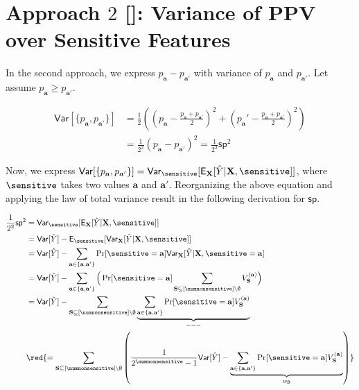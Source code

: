 















\section{Approach $ 2 $ []: Variance of PPV over Sensitive Features} 

In the second approach, we express $ p_\mathbf{a} - p_{\mathbf{a}'} $ with variance of $ p_\mathbf{a} $ and  $ p_{\mathbf{a}'} $.  Let assume $ p_\mathbf{a} \ge  p_{\mathbf{a}'} $. 

\begin{align*}
	\mathsf{Var}[\{p_\mathbf{a}, p_{\mathbf{a}'} \}] &= \frac{1}{2}((p_\mathbf{a} - \frac{p_\mathbf{a} + p_{\mathbf{a}'}}{2})^2 + (p_\mathbf{a}' - \frac{p_\mathbf{a} + p_{\mathbf{a}'}}{2})^2)\\
	&= \frac{1}{2^2}(p_\mathbf{a} -  p_{\mathbf{a}'})^2 = \frac{1}{2^2}\mathsf{sp}^2
\end{align*}

Now, we express $ \mathsf{Var}[\{p_\mathbf{a}, p_{\mathbf{a}'} \}] =  \mathsf{Var}_\sensitive[\mathsf{E}_{\mathbf{X}}[\hat{Y}|\mathbf{X}, \sensitive]] $, where $ \sensitive $ takes two values $ \mathbf{a} $ and $ \mathbf{a}' $.  Reorganizing the above equation and applying the law of total variance result in the following derivation for $ \mathsf{sp} $.

\begin{align*}
	\frac{1}{2^2}\mathsf{sp}^2 &= \mathsf{Var}_\sensitive[\mathsf{E}_{\mathbf{X}}[\hat{Y}|\mathbf{X}, \sensitive]]\\
	&= \mathsf{Var}[\hat{Y}] - \mathsf{E}_\sensitive[\mathsf{Var}_{\mathbf{X}}[\hat{Y}|\mathbf{X}, \sensitive]]\\
	&= \mathsf{Var}[\hat{Y}] - \sum_{\mathbf{a} \in \{\mathbf{a}, \mathbf{a}'\}} \Pr[\sensitive=\mathbf{a}] \mathsf{Var}_{\mathbf{X}}[\hat{Y}|\mathbf{X}, \sensitive=\mathbf{a}]\\
	&= \mathsf{Var}[\hat{Y}] - \sum_{\mathbf{a} \in \{\mathbf{a}, \mathbf{a}'\}} \Big(\Pr[\sensitive=\mathbf{a}] \sum_{\mathbf{S} \subseteq [\numnonsensitive] \setminus \emptyset} V_{\mathbf{S}}^{(\mathbf{a})} \Big)\\
	&= \mathsf{Var}[\hat{Y}] -  \sum_{\mathbf{S} \subseteq [\numnonsensitive] \setminus \emptyset} \underbrace{\sum_{\mathbf{a} \in \{\mathbf{a}, \mathbf{a}'\}} \Pr[\sensitive=\mathbf{a}]V_{\mathbf{S}}^{(\mathbf{a})}}_{---}\\
	&\red{= \sum_{\mathbf{S} \subseteq [\numnonsensitive] \setminus \emptyset} \left(\frac{1}{2^\numnonsensitive - 1} \mathsf{Var}[\hat{Y}] -   \underbrace{\sum_{\mathbf{a} \in \{\mathbf{a}, \mathbf{a}'\}} \Pr[\sensitive=\mathbf{a}]V_{\mathbf{S}}^{(\mathbf{a})}}_{w_{\mathbf{S}}}\right)}\\
\end{align*}


